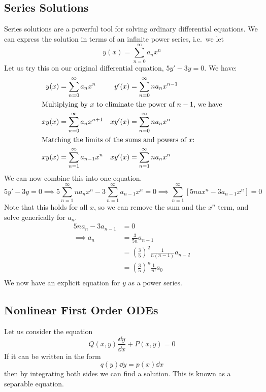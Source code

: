 \subsection{Series Solutions}
Series solutions are a powerful tool for solving ordinary differential equations. We can express the solution in terms of an infinite power series, i.e.\ we let
\[ y(x) = \sum_{n=0}^\infty a_nx^n \]
Let us try this on our original differential equation, \(5y' - 3y = 0\). We have:
\begin{align*}
	y(x)  & = \sum_{n=0}^\infty a_nx^n     & y'(x)  & = \sum_{n=0}^\infty na_nx^{n-1} \\
	\intertext{Multiplying by \(x\) to eliminate the power of \(n-1\), we have}
	xy(x) & = \sum_{n=0}^\infty a_nx^{n+1} & xy'(x) & = \sum_{n=0}^\infty na_nx^n     \\
	\intertext{Matching the limits of the sums and powers of \(x\):}
	xy(x) & = \sum_{n=1}^\infty a_{n-1}x^n & xy'(x) & = \sum_{n=1}^\infty na_nx^n     \\
\end{align*}
We can now combine this into one equation.
\[ 5y' - 3y = 0 \implies 5\sum_{n=1}^\infty na_nx^n - 3\sum_{n=1}^\infty a_{n-1}x^n = 0 \implies \sum_{n=1}^\infty \left[ 5nax^n - 3a_{n-1}x^n \right] = 0 \]
Note that this holds for all \(x\), so we can remove the sum and the \(x^n\) term, and solve generically for \(a_n\).
\begin{align*}
	5na_n - 3a_{n-1} & = 0                                                   \\
	\implies a_n     & = \frac{3}{5n} a_{n-1}                                \\
	                 & = \left(\frac{3}{5}\right)^2 \frac{1}{n(n-1)} a_{n-2} \\
	                 & = \left(\frac{3}{5}\right)^n \frac{1}{n!} a_{0}       \\
\end{align*}
We now have an explicit equation for \(y\) as a power series.

\subsection{Nonlinear First Order ODEs}
Let us consider the equation
\[ Q(x, y)\frac{\dd{y}}{\dd{x}} + P(x, y) = 0 \]
If it can be written in the form
\[ q(y) \dd{y} = p(x) \dd{x} \]
then by integrating both sides we can find a solution. This is known as a separable equation.

